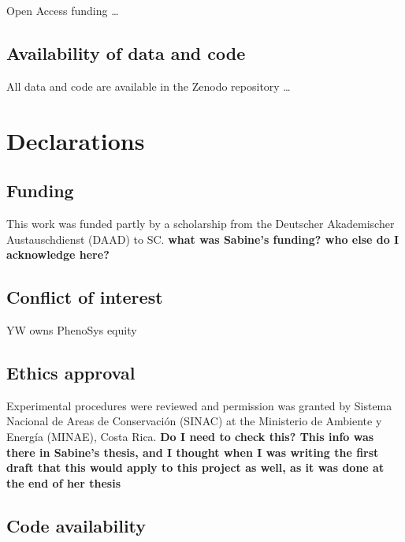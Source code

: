 \documentclass[
]{article}
\begin{document}
Open Access funding \ldots{}

\hypertarget{availability-of-data-and-code}{%
\subsection{Availability of data and code}\label{availability-of-data-and-code}}

All data and code are available in the Zenodo repository \ldots{}

\hypertarget{declarations}{%
\section{Declarations}\label{declarations}}

\hypertarget{funding-1}{%
\subsection{Funding}\label{funding-1}}

This work was funded partly by a scholarship from the Deutscher Akademischer Austauschdienst (DAAD) to SC. \textbf{what was Sabine's funding? who else do I acknowledge here?}

\hypertarget{conflict-of-interest}{%
\subsection{Conflict of interest}\label{conflict-of-interest}}

YW owns PhenoSys equity

\hypertarget{ethics-approval}{%
\subsection{Ethics approval}\label{ethics-approval}}

Experimental procedures were reviewed and permission was granted by Sistema Nacional de Areas de Conservación (SINAC) at the Ministerio de Ambiente y Energía (MINAE), Costa Rica. \textbf{Do I need to check this? This info was there in Sabine's thesis, and I thought when I was writing the first draft that this would apply to this project as well, as it was done at the end of her thesis}

\hypertarget{code-availability}{%
\subsection{Code availability}\label{code-availability}}
\end{document}
